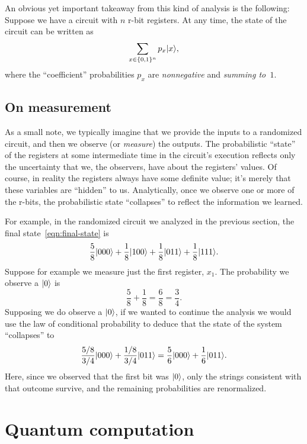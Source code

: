 \documentclass[12pt]{article}
\begin{document}
\begin{remark}                  \label{rem:sum-to-1}
    An obvious yet important takeaway from this kind of analysis is the following:  Suppose we have a circuit with $n$ r-bit registers.  At any time, the state of the circuit can be written as
    \[
        \sum_{x \in \{0,1\}^n} p_x \ket{x},
    \]
    where the ``coefficient'' probabilities $p_x$ are \emph{nonnegative} and \emph{summing to~$1$}.
\end{remark}


\subsection{On measurement}
As a small note, we typically imagine that we provide the inputs to a randomized circuit, and then we observe (or \emph{measure}) the outputs.  The probabilistic ``state'' of the registers at some intermediate time in the circuit's execution reflects only the uncertainty that we, the observers, have about the registers' values.  Of course, in reality the registers always have some definite value; it's merely that these variables are ``hidden'' to us.  Analytically, once we observe one or more of the r-bits, the probabilistic state ``collapses'' to reflect the information we learned.  

For example, in the randomized circuit we analyzed in the previous section, the final state~\eqref{eqn:final-state} is
\[
    \frac58 \ket{000} + \frac18\ket{100} + \frac18\ket{011} + \frac18\ket{111}.
\]
Suppose for example we measure just the first register, $x_1$.  The probability we observe a $\ket{0}$ is
\[
    \frac58 + \frac18  = \frac68 = \frac34.
\]
Supposing we do observe a $\ket{0}$, if we wanted to continue the analysis we would use the law of conditional probability to deduce that the state of the system ``collapses'' to 
\[
    \frac{5/8}{3/4} \ket{000} + \frac{1/8}{3/4}\ket{011} = \frac56 \ket{000} + \frac16\ket{011}.
\]
Here, since we observed that the first bit was $\ket{0}$, only the strings consistent with that outcome survive, and the remaining probabilities are renormalized.

\section{Quantum computation}
\end{document}
